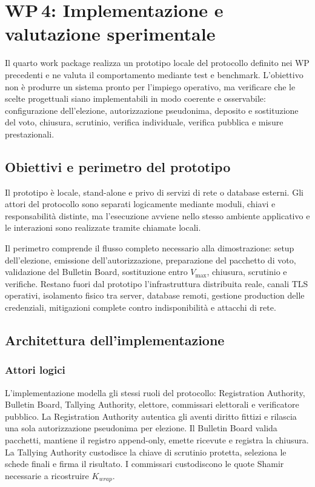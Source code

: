 \section[WP4: Implementazione e valutazione sperimentale]{WP\,4: Implementazione e valutazione sperimentale}
\label{wp4:implementazione-valutazione}

Il quarto work package realizza un prototipo locale del protocollo definito nei WP precedenti e ne valuta il comportamento mediante test e benchmark. L'obiettivo non \`e produrre un sistema pronto per l'impiego operativo, ma verificare che le scelte progettuali siano implementabili in modo coerente e osservabile: configurazione dell'elezione, autorizzazione pseudonima, deposito e sostituzione del voto, chiusura, scrutinio, verifica individuale, verifica pubblica e misure prestazionali.

\subsection{Obiettivi e perimetro del prototipo}
\label{wp4:obiettivi-perimetro}

Il prototipo \`e locale, stand-alone e privo di servizi di rete o database esterni. Gli attori del protocollo sono separati logicamente mediante moduli, chiavi e responsabilit\`a distinte, ma l'esecuzione avviene nello stesso ambiente applicativo e le interazioni sono realizzate tramite chiamate locali.

Il perimetro comprende il flusso completo necessario alla dimostrazione: setup dell'elezione, emissione dell'autorizzazione, preparazione del pacchetto di voto, validazione del Bulletin Board, sostituzione entro $V_{\max}$, chiusura, scrutinio e verifiche. Restano fuori dal prototipo l'infrastruttura distribuita reale, canali TLS operativi, isolamento fisico tra server, database remoti, gestione production delle credenziali, mitigazioni complete contro indisponibilit\`a e attacchi di rete.

\subsection{Architettura dell'implementazione}
\label{wp4:architettura}

\subsubsection{Attori logici}

L'implementazione modella gli stessi ruoli del protocollo: Registration Authority, Bulletin Board, Tallying Authority, elettore, commissari elettorali e verificatore pubblico. La Registration Authority autentica gli aventi diritto fittizi e rilascia una sola autorizzazione pseudonima per elezione. Il Bulletin Board valida pacchetti, mantiene il registro append-only, emette ricevute e registra la chiusura. La Tallying Authority custodisce la chiave di scrutinio protetta, seleziona le schede finali e firma il risultato. I commissari custodiscono le quote Shamir necessarie a ricostruire $K_{\mathit{wrap}}$.

